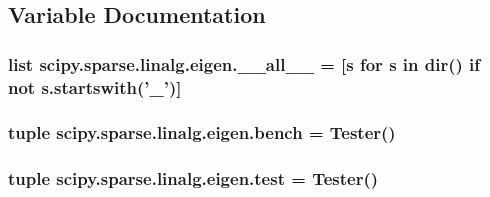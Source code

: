 \subsection{Variable Documentation}
\hypertarget{namespacescipy_1_1sparse_1_1linalg_1_1eigen_ada87267193e73e0b8fb11d1f19f42e53}{}
\subsubsection[{\+\_\+\+\_\+all\+\_\+\+\_\+}]{\setlength{\rightskip}{0pt plus 5cm}list scipy.\+sparse.\+linalg.\+eigen.\+\_\+\+\_\+all\+\_\+\+\_\+ = \mbox{[}{\bf s} for {\bf s} in dir() {\bf if} not s.\+startswith('\+\_\+')\mbox{]}}\label{namespacescipy_1_1sparse_1_1linalg_1_1eigen_ada87267193e73e0b8fb11d1f19f42e53}
\hypertarget{namespacescipy_1_1sparse_1_1linalg_1_1eigen_a17db74fb45765a04d3d42aa9a9879e3c}{}
\subsubsection[{bench}]{\setlength{\rightskip}{0pt plus 5cm}tuple scipy.\+sparse.\+linalg.\+eigen.\+bench = Tester()}\label{namespacescipy_1_1sparse_1_1linalg_1_1eigen_a17db74fb45765a04d3d42aa9a9879e3c}
\hypertarget{namespacescipy_1_1sparse_1_1linalg_1_1eigen_a9c9e67647d29435fc8366aacab20853c}{}
\subsubsection[{test}]{\setlength{\rightskip}{0pt plus 5cm}tuple scipy.\+sparse.\+linalg.\+eigen.\+test = Tester()}\label{namespacescipy_1_1sparse_1_1linalg_1_1eigen_a9c9e67647d29435fc8366aacab20853c}
